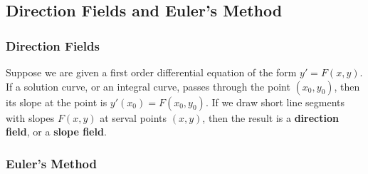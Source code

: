 \subsection{Direction Fields and Euler's Method}
\subsubsection{Direction Fields}
Suppose we are given a first order differential equation of the form \(y'=F(x,y)\).
If a solution curve, or an integral curve, passes through the point
\((x_0,y_0)\), then its slope at the point is \(y'(x_0)=F(x_0,y_0)\).
If we draw short line segments with slopes \(F(x,y)\) at serval points
\((x,y)\), then the result is a \textbf{direction field}, or a
\textbf{slope field}.

\subsubsection{Euler's Method}